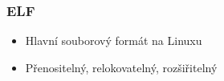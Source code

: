


\subtitle{V. ELF II.}
\date{18. 10. \the\year}



\begin{frame}
  \titlepage
\end{frame}



\begin{frame}
  \frametitle{ELF}

  \begin{itemize}
    \item Hlavní souborový formát na Linuxu
    \item Přenositelný, relokovatelný, rozšiřitelný
  \end{itemize}

\end{frame}






